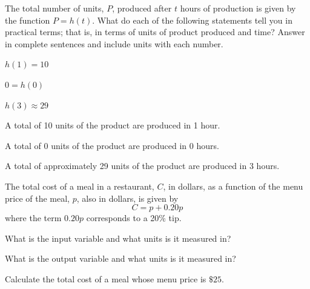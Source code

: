 \begin{exercise}
The total number of units, $P$, produced after $t$ hours of production is given by the function $P=h(t)$. What do each of the following statements tell you in practical terms; that is, in terms of units of product produced and time? Answer in complete sentences and include units with each number.


\begin{parts}
        \item  $h(1)=10$
        \item  $0=h(0)$
        \item  $h(3) \approx 29 $
\end{parts}
\end{exercise}

\begin{solution}

\begin{parts}
\item A total of 10 units of the product are produced in 1 hour.
\item A total of 0 units of the product are produced in 0 hours.
\item A total of approximately 29 units of the product are produced in 3 hours.
\end{parts}
\end{solution}









\begin{exercise}
The total cost of a meal in a restaurant, $C$, in dollars, as a function of the menu price of the meal, $p$, also in dollars, is given by
\[C=p+0.20p\]
where the term $0.20p$ corresponds to a 20\% tip.


\begin{parts}
\item What is the input variable and what units is it measured in? 

\item What is the output variable and what units is it measured in? 

\item Calculate the total cost of a meal whose menu price is $\$25$.
\end{parts}

\end{exercise}





